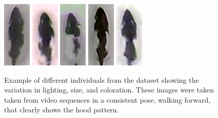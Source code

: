\documentclass[conference,10pt,times,letter]{IEEEtran}
\newlength{\frameHeight}
\begin{document}

\setlength{\frameHeight}{3.9cm}
\begin{figure}[h]
\begin{center}
\includegraphics[height=\frameHeight]{dataset/1.png}
\includegraphics[height=\frameHeight]{dataset/3.png}
\includegraphics[height=\frameHeight]{dataset/4.png}
\includegraphics[height=\frameHeight]{dataset/5.png}
\includegraphics[height=\frameHeight]{dataset/7.png}
\end{center}
\caption{Example of different individuals from the dataset showing the variation in lighting, size, and coloration. These images were taken taken from video sequences in a consistent pose, walking forward, that clearly shows the hood pattern. }
\end{figure}
\end{document}
